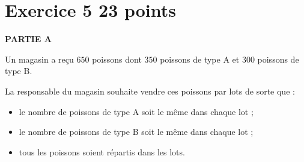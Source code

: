 \documentclass[11pt]{article}
\begin{document}
\bigskip

\begin{scratch}
 \end{scratch}\hfill \begin{scratch}\end{scratch}\hfill \begin{scratch} \end{scratch}

\medskip

\begin{scratch}\end{scratch}\hfill \begin{scratch} \end{scratch} \hfill \begin{scratch}\end{scratch}

\bigskip

\section*{Exercice 5 \hfill 23 points}

\textbf{PARTIE A}

\medskip

Un magasin a reçu $650$ poissons dont $350$ poissons de type A et $300$ poissons de type B.

La responsable du magasin souhaite vendre ces poissons par lots de sorte que :

\begin{itemize}[label=$\bullet~$]
\item le nombre de poissons de type A soit le même dans chaque lot ;
\item le nombre de poissons de type B soit le même dans chaque lot ;
\item tous les poissons soient répartis dans les lots.
\end{itemize}

\end{document}
